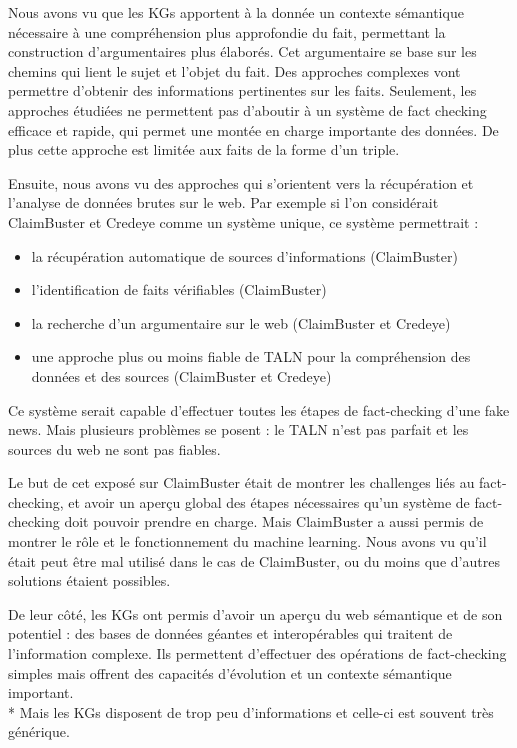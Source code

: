 Nous avons vu que les KGs apportent à la donnée un contexte sémantique nécessaire à une compréhension plus approfondie du fait, permettant la construction d'argumentaires plus élaborés. Cet argumentaire se base sur les chemins qui lient le sujet et l'objet du fait. Des approches complexes vont permettre d'obtenir des informations pertinentes sur les faits. Seulement, les approches étudiées ne permettent pas d'aboutir à un système de fact checking efficace et rapide, qui permet une montée en charge importante des données. De plus cette approche est limitée aux faits de la forme d'un triple.

Ensuite, nous avons vu des approches qui s'orientent vers la récupération et l'analyse de données brutes sur le web. Par exemple si l'on considérait ClaimBuster et Credeye comme un système unique, ce système permettrait :
\begin{itemize}
    \item la récupération automatique de sources d'informations (ClaimBuster)
    \item l'identification de faits vérifiables (ClaimBuster)
    \item la recherche d'un argumentaire sur le web (ClaimBuster et Credeye)
    \item une approche plus ou moins fiable de TALN pour la compréhension des données et des sources (ClaimBuster et Credeye)
\end{itemize}
Ce système serait capable d'effectuer toutes les étapes de fact-checking d'une fake news. Mais plusieurs problèmes se posent : le TALN n'est pas parfait et les sources du web ne sont pas fiables. 

Le but de cet exposé sur ClaimBuster était de montrer les challenges liés au fact-checking, et avoir un aperçu global des étapes nécessaires qu'un système de fact-checking doit pouvoir prendre en charge. Mais ClaimBuster a aussi permis de montrer le rôle et le fonctionnement du machine learning. Nous avons vu qu'il était peut être mal utilisé dans le cas de ClaimBuster, ou du moins que d'autres solutions étaient possibles.

De leur côté, les KGs ont permis d'avoir un aperçu du web sémantique et de son potentiel : des bases de données géantes et interopérables qui traitent de l'information complexe. Ils permettent d'effectuer des opérations de fact-checking simples mais offrent des capacités d'évolution et un contexte sémantique important.
\\*
Mais les KGs disposent de trop peu d'informations et celle-ci est souvent très générique.

